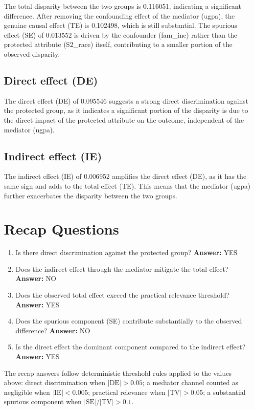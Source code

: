 \documentclass[11pt]{article}
\begin{document}
The total disparity between the two groups is 0.116051, indicating a significant difference. After removing the confounding effect of the mediator (ugpa), the genuine causal effect (TE) is 0.102498, which is still substantial. The spurious effect (SE) of 0.013552 is driven by the confounder (fam\_inc) rather than the protected attribute (S2\_race) itself, contributing to a smaller portion of the observed disparity.

\subsection{Direct effect (DE)}

The direct effect (DE) of 0.095546 suggests a strong direct discrimination against the protected group, as it indicates a significant portion of the disparity is due to the direct impact of the protected attribute on the outcome, independent of the mediator (ugpa).

\subsection{Indirect effect (IE)}

The indirect effect (IE) of 0.006952 amplifies the direct effect (DE), as it has the same sign and adds to the total effect (TE). This means that the mediator (ugpa) further exacerbates the disparity between the two groups.

\section{Recap Questions}

\begin{enumerate}
\item Is there direct discrimination against the protected group? \textbf{Answer:} YES
\item Does the indirect effect through the mediator mitigate the total effect? \textbf{Answer:} NO
\item Does the observed total effect exceed the practical relevance threshold? \textbf{Answer:} YES
\item Does the spurious component (SE) contribute substantially to the observed difference? \textbf{Answer:} NO
\item Is the direct effect the dominant component compared to the indirect effect? \textbf{Answer:} YES
\end{enumerate}

\vspace{1em}
\noindent\footnotesize
The recap answers follow deterministic threshold rules applied to the values above: direct discrimination when $|\mathrm{DE}| > 0.05$; a mediator channel counted as negligible when $|\mathrm{IE}| < 0.005$; practical relevance when $|\mathrm{TV}| > 0.05$; a substantial spurious component when $|\mathrm{SE}| / |\mathrm{TV}| > 0.1$.
\end{document}
